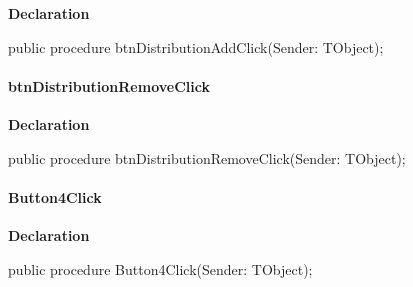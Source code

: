 \documentclass{report}
\newif\ifpdf
\begin{document}
\label{prjwizard.TfrmProjectWizard-btnDistributionAddClick}
\begin{list}{}{
\setlength{\itemindent}{0cm}
\setlength{\listparindent}{0cm}
\setlength{\leftmargin}{\evensidemargin}
\addtolength{\leftmargin}{\tmplength}
\settowidth{\labelsep}{X}
\addtolength{\leftmargin}{\labelsep}
\setlength{\labelwidth}{\tmplength}
}
\item[\textbf{Declaration}\hfill]
\ifpdf
\begin{flushleft}
\fi
\begin{ttfamily}
public procedure btnDistributionAddClick(Sender: TObject);\end{ttfamily}

\ifpdf
\end{flushleft}
\fi

\end{list}
\paragraph*{btnDistributionRemoveClick}\hspace*{\fill}

\label{prjwizard.TfrmProjectWizard-btnDistributionRemoveClick}
\begin{list}{}{
\setlength{\itemindent}{0cm}
\setlength{\listparindent}{0cm}
\setlength{\leftmargin}{\evensidemargin}
\addtolength{\leftmargin}{\tmplength}
\settowidth{\labelsep}{X}
\addtolength{\leftmargin}{\labelsep}
\setlength{\labelwidth}{\tmplength}
}
\item[\textbf{Declaration}\hfill]
\ifpdf
\begin{flushleft}
\fi
\begin{ttfamily}
public procedure btnDistributionRemoveClick(Sender: TObject);\end{ttfamily}

\ifpdf
\end{flushleft}
\fi

\end{list}
\paragraph*{Button4Click}\hspace*{\fill}

\label{prjwizard.TfrmProjectWizard-Button4Click}
\begin{list}{}{
\setlength{\itemindent}{0cm}
\setlength{\listparindent}{0cm}
\setlength{\leftmargin}{\evensidemargin}
\addtolength{\leftmargin}{\tmplength}
\settowidth{\labelsep}{X}
\addtolength{\leftmargin}{\labelsep}
\setlength{\labelwidth}{\tmplength}
}
\item[\textbf{Declaration}\hfill]
\ifpdf
\begin{flushleft}
\fi
\begin{ttfamily}
public procedure Button4Click(Sender: TObject);\end{ttfamily}

\ifpdf
\end{flushleft}
\fi

\end{list}
\end{document}
